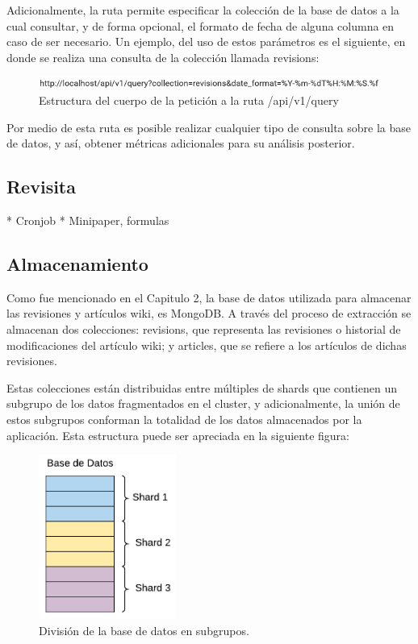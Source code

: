 Adicionalmente, la ruta permite especificar la colección de la base de datos a la cual consultar, y de forma opcional,
el formato de fecha de alguna columna en caso de ser necesario.
Un ejemplo, del uso de estos parámetros es el siguiente, en donde se realiza una consulta de la colección llamada revisions:

\begin{figure}[H]
	\centering
		\includegraphics[width=1\textwidth]{figures/query_url}
	\caption{Estructura del cuerpo de la petición a la ruta /api/v1/query}
	\label{fig:query_url}
\end{figure}

Por medio de esta ruta es posible realizar cualquier tipo de consulta sobre la base de datos, y así, obtener métricas
adicionales para su análisis posterior.

\subsection{Revisita}

* Cronjob
* Minipaper, formulas

\subsection{Almacenamiento}

Como fue mencionado en el Capitulo 2, la base de datos utilizada para almacenar las revisiones y artículos wiki, es MongoDB.
A través del proceso de extracción se almacenan dos colecciones:
revisions, que representa las revisiones o historial de modificaciones del artículo wiki;
 y articles, que se refiere a los artículos de dichas revisiones.

Estas colecciones están distribuidas entre múltiples de shards que contienen un subgrupo de los datos fragmentados en el cluster, y adicionalmente, la unión de estos subgrupos conforman la totalidad de los datos almacenados por la aplicación.
Esta estructura puede ser apreciada en la siguiente figura:

\begin{figure}[H]
	\centering
		\includegraphics[width=0.4\textwidth]{figures/sharded_database}
	\caption{División de la base de datos en subgrupos.}
	\label{fig:sharded_database}
\end{figure}

